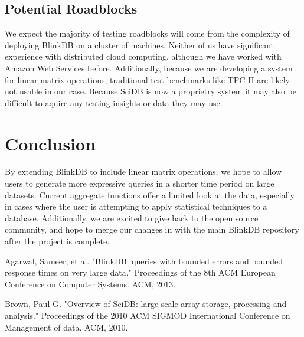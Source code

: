 \documentclass[twoside]{article}
\begin{document}
\begin{multicols}{2}
\subsection{Potential Roadblocks}
We expect the majority of testing roadblocks will come from the complexity of deploying BlinkDB on a cluster of machines. Neither of us have significant experience with distributed cloud computing, although we have worked with Amazon Web Services before. Additionally, because we are developing a system for linear matrix operations, traditional test benchmarks like TPC-H are likely not usable in our case. Because SciDB is now a proprietry system it may also be difficult to aquire any testing insights or data they may use.

\section{Conclusion}
By extending BlinkDB to include linear matrix operations, we hope to allow users to generate more expressive queries in a shorter time period on large datasets. Current aggregate functions offer a limited look at the data, especially in cases where the user is attempting to apply statistical techniques to a database. Additionally, we are excited to give back to the open source community, and hope to merge our changes in with the main BlinkDB repository after the project is complete.


\begin{thebibliography}{99} %

Agarwal, Sameer, et al. "BlinkDB: queries with bounded errors and bounded response times on very large data." Proceedings of the 8th ACM European Conference on Computer Systems. ACM, 2013.

Brown, Paul G. "Overview of SciDB: large scale array storage, processing and analysis." Proceedings of the 2010 ACM SIGMOD International Conference on Management of data. ACM, 2010.
 
\end{thebibliography}


\end{multicols}
\end{document}
